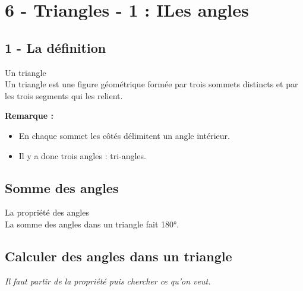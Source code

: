 



\section*{6 - Triangles - 1 : ILes angles}

\subsection*{1 - La définition}

\begin{Definition}{Un triangle}\\
 Un triangle est une figure géométrique formée par trois sommets distincts et par les trois segments qui les relient.
\end{Definition}

\textbf{Remarque : }

\begin{itemize}[label={$\bullet$}]
  \item En chaque sommet les côtés délimitent un angle intérieur. 
  \item Il y a donc trois angles : tri-angles.
\end{itemize}


\subsection*{Somme des angles}

\begin{Definition}{La propriété des angles}\\
  La somme des angles dans un triangle fait 180°.
\end{Definition}


\subsection*{Calculer des angles dans un triangle}

\textit{Il faut partir de la propriété puis chercher ce qu'on veut.} \\

